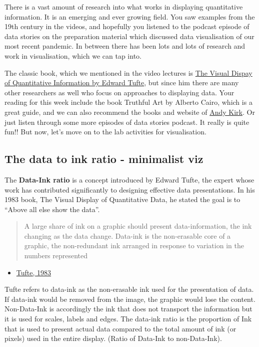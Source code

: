 \documentclass[
]{book}
\providecommand{\tightlist}{%
  \setlength{\itemsep}{0pt}\setlength{\parskip}{0pt}}
\begin{document}
There is a vast amount of research into what works in displaying quantitative information. It is an emerging and ever growing field. You saw examples from the 19th century in the videos, and hopefully you listened to the podcast episode of data stories on the preparation material which discussed data visualisation of our most recent pandemic. In between there has been lots and lots of research and work in visualisation, which we can tap into.

The classic book, which we mentioned in the video lectures is \href{https://www.edwardtufte.com/tufte/books_vdqi}{The Visual Dispay of Quantitative Information by Edward Tufte}, but since him there are many other researchers as well who focus on approaches to displaying data. Your reading for this week include the book Truthful Art by Alberto Cairo, which is a great guide, and we can also recommend the books and website of \href{https://www.visualisingdata.com/}{Andy Kirk}. Or just listen through some more episodes of data stories podcast. It really is quite fun!! But now, let's move on to the lab activities for visualisation.

\hypertarget{the-data-to-ink-ratio---minimalist-viz}{%
\subsection{The data to ink ratio - minimalist viz}\label{the-data-to-ink-ratio---minimalist-viz}}

The \textbf{Data-Ink ratio} is a concept introduced by Edward Tufte, the expert whose work has contributed significantly to designing effective data presentations. In his 1983 book, The Visual Display of Quantitative Data, he stated the goal is to ``Above all else show the data''.

\begin{quote}
A large share of ink on a graphic should present data-information, the ink changing as the data change. Data-ink is the non-erasable core of a graphic, the non-redundant ink arranged in response to variation in the numbers represented
\end{quote}

\begin{itemize}
\tightlist
\item
  \href{https://www.edwardtufte.com/tufte/books_vdqi}{Tufte, 1983}
\end{itemize}

Tufte refers to data-ink as the non-erasable ink used for the presentation of data. If data-ink would be removed from the image, the graphic would lose the content. Non-Data-Ink is accordingly the ink that does not transport the information but it is used for scales, labels and edges. The data-ink ratio is the proportion of Ink that is used to present actual data compared to the total amount of ink (or pixels) used in the entire display. (Ratio of Data-Ink to non-Data-Ink).
\end{document}
